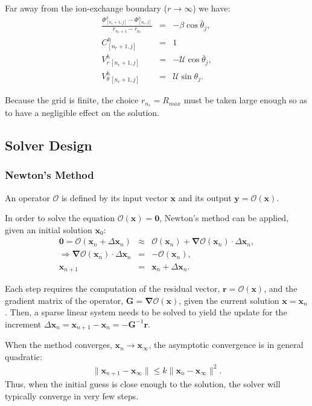 \documentclass[final]{elsarticle}
\newcommand\bnabla{\boldsymbol{\nabla}}
\newcommand\bG{\boldsymbol{G}}
\newcommand\bx{\boldsymbol{x}}
\newcommand\by{\boldsymbol{y}}
\newcommand\br{\boldsymbol{r}}
\newcommand\bzero{\boldsymbol{0}}
\newcommand\cO{\mathcal{O}}
\newcommand\cU{\mathscr{U}}
\begin{document}
Far away from the ion-exchange boundary ($r\rightarrow\infty$) we have:
\begin{eqnarray*}
\frac{\varPhi^h_{[n_r + 1, j]} - \varPhi^h_{[n_r, j]}}{\bar{r}_{n_r + 1} - \bar{r}_{n_r}} 
 & = & -\beta \cos\bar{\theta}_j, \\
C^h_{[n_r + 1, j]} & = & 1 \\
V_r^h{}_{[n_r + 1, j]} & = & -\cU \cos\bar{\theta}_j, \\
V_\theta^h{}_{[n_r + 1, j]} & = & \cU \sin\theta_j.
\end{eqnarray*}

Because the grid is finite, the choice 
$r_{n_r} = R_{max}$ must be taken large enough so as to have a negligible effect
on the solution.

\subsection{Solver Design}
\subsubsection{Newton's Method}
An operator $\cO$ is defined by its input vector $\bx$ and its output 
$\by = \cO(\bx)$.

In order to solve the equation $\cO(\bx) = \bzero$, Newton's method can 
be applied, given an initial solution $\bx_0$:
\begin{eqnarray*}
\bzero = \cO(\bx_n + \Delta \bx_n) &\approx& \cO(\bx_n) + \bnabla \cO(\bx_n)\cdot\Delta\bx_n, \\
\Rightarrow \bnabla \cO(\bx_n) \cdot \Delta \bx_n &=& -\cO(\bx_n), \\
\bx_{n+1} &=& \bx_{n} + \Delta \bx_n. 
\end{eqnarray*}

Each step requires the computation of the residual vector, $\br = \cO(\bx)$, and
the gradient matrix of the operator, $\bG = \bnabla \cO(\bx)$, 
given the current solution $\bx = \bx_n$.
Then, a sparse linear system needs to be solved to yield the update for the 
increment $\Delta \bx_n = \bx_{n+1} - \bx_n = -\bG^{-1} \br$.

When the method converges, $\bx_n \rightarrow \bx_\infty$, 
the asymptotic convergence is in general quadratic:
\begin{eqnarray*}
\|\bx_{n+1} - \bx_\infty\| \le k \|\bx_{n} - \bx_\infty\|^2.
\end{eqnarray*}
Thus, when the initial guess is close enough to the solution, the solver
will typically converge in very few steps.
\end{document}
